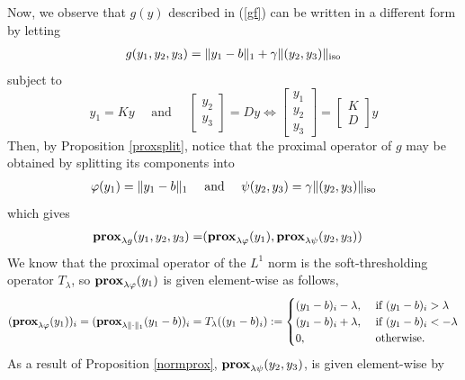 \documentclass{article}
\theoremstyle{definition}
\theoremstyle{remark}
\begin{document}
  Now, we observe that $g(y)$ described in  (\ref{gf}) can be written in a different form by letting  
  \begin{equation}
    \begin{split}
      g(y_1, y_2, y_3) = \| y_1 -b \|_{1} + \gamma \|(y_2, y_3) \|_{\operatorname{{iso}}}
    \end{split}
  \end{equation}
  subject to 
  $$y_1 = Ky\quad \text{ and }\quad \begin{bmatrix}
    y_2 \\ y_3 
  \end{bmatrix} = Dy \iff \begin{bmatrix}
    y_1\\ y_2 \\ y_3
  \end{bmatrix} = \begin{bmatrix}
    K\\ D 
  \end{bmatrix} y  $$ 
  Then, by Proposition \ref{proxsplit}, notice that the proximal operator of $g$ may be obtained by splitting its components into 
  \begin{equation*}
    \begin{split}
      \varphi(y_1) = \|y_1 -b \|_1 \quad \text{ and } \quad \psi(y_2, y_3)= \gamma \| (y_2, y_3)\|_{\operatorname{{iso}}}
    \end{split}
  \end{equation*}
  which gives 
  \begin{equation}
    \begin{split}
      \operatorname{\mathbf{prox}}_{\lambda g}(y_1, y_2, y_3) =&(\operatorname{\mathbf{prox}}_{\lambda \varphi}(y_1), \operatorname{\mathbf{prox}}_{\lambda \psi}(y_2, y_3))
    \end{split}
  \end{equation}
  We know that the proximal operator of the $L^1$ norm is the soft-thresholding operator $T_\lambda$, so $\operatorname{\mathbf{prox}}_{\lambda \varphi} (y_1)$ is given element-wise as follows, 
  \begin{equation}
       (\operatorname{\mathbf{prox}}_{\lambda \varphi} (y_1))_i = (\operatorname{\mathbf{prox}}_{\lambda \|\cdot\|_1}(y_1-b))_i= T_\lambda({(y_1-b)_i}) :=  
      \begin{cases}
        (y_1-b)_i - \lambda, &\text{ if } (y_1-b)_i >\lambda\\ 
        (y_1-b)_i+ \lambda, &\text{ if }(y_1-b)_i <-\lambda  \\ 
        0, &\text{ otherwise. }
      \end{cases}
  \end{equation}
  As a result of Proposition \ref{normprox}, $\operatorname{\mathbf{prox}}_{\lambda \psi}(y_2, y_3)$, is given element-wise by 
\end{document}
